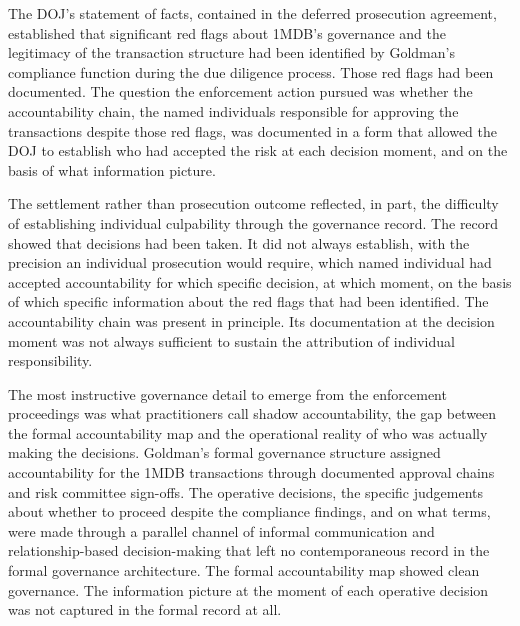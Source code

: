 The DOJ's statement of facts, contained in the deferred prosecution agreement, established that significant red flags about 1MDB's governance and the legitimacy of the transaction structure had been identified by Goldman's compliance function during the due diligence process. Those red flags had been documented. The question the enforcement action pursued was whether the accountability chain, the named individuals responsible for approving the transactions despite those red flags, was documented in a form that allowed the DOJ to establish who had accepted the risk at each decision moment, and on the basis of what information picture.

The settlement rather than prosecution outcome reflected, in part, the difficulty of establishing individual culpability through the governance record. The record showed that decisions had been taken. It did not always establish, with the precision an individual prosecution would require, which named individual had accepted accountability for which specific decision, at which moment, on the basis of which specific information about the red flags that had been identified. The accountability chain was present in principle. Its documentation at the decision moment was not always sufficient to sustain the attribution of individual responsibility.

The most instructive governance detail to emerge from the enforcement proceedings was what practitioners call shadow accountability, the gap between the formal accountability map and the operational reality of who was actually making the decisions. Goldman's formal governance structure assigned accountability for the 1MDB transactions through documented approval chains and risk committee sign-offs. The operative decisions, the specific judgements about whether to proceed despite the compliance findings, and on what terms, were made through a parallel channel of informal communication and relationship-based decision-making that left no contemporaneous record in the formal governance architecture. The formal accountability map showed clean governance. The information picture at the moment of each operative decision was not captured in the formal record at all.

